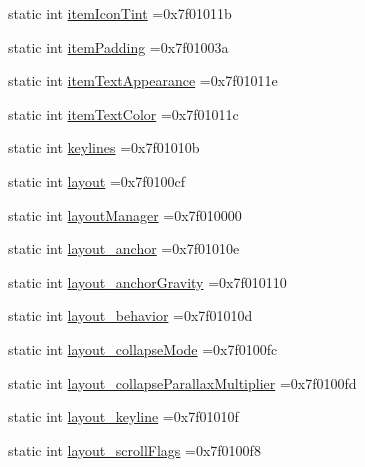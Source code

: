 \begin{DoxyCompactItemize}
static int \hyperlink{classandroid_1_1support_1_1graphics_1_1drawable_1_1R_1_1attr_a09810cf691cdb1d0ea29a12e2f0de04a}{item\+Icon\+Tint} =0x7f01011b
\item 
static int \hyperlink{classandroid_1_1support_1_1graphics_1_1drawable_1_1R_1_1attr_ac1e93d0be06d113523f87e0b3b6d7810}{item\+Padding} =0x7f01003a
\item 
static int \hyperlink{classandroid_1_1support_1_1graphics_1_1drawable_1_1R_1_1attr_ac97720f26eccd2c5a5b72930a9297912}{item\+Text\+Appearance} =0x7f01011e
\item 
static int \hyperlink{classandroid_1_1support_1_1graphics_1_1drawable_1_1R_1_1attr_aa9c6b70d39d287b5016e76134718fca8}{item\+Text\+Color} =0x7f01011c
\item 
static int \hyperlink{classandroid_1_1support_1_1graphics_1_1drawable_1_1R_1_1attr_ad3dde851a1427fea57cfeff89813c49c}{keylines} =0x7f01010b
\item 
static int \hyperlink{classandroid_1_1support_1_1graphics_1_1drawable_1_1R_1_1attr_aa4259dc1ddae8e91fd28209cd7a35c8e}{layout} =0x7f0100cf
\item 
static int \hyperlink{classandroid_1_1support_1_1graphics_1_1drawable_1_1R_1_1attr_a4224aee7193f65c83cab1f5837843f57}{layout\+Manager} =0x7f010000
\item 
static int \hyperlink{classandroid_1_1support_1_1graphics_1_1drawable_1_1R_1_1attr_a8edbd974e6fb3f6c893b59fe321abe31}{layout\+\_\+anchor} =0x7f01010e
\item 
static int \hyperlink{classandroid_1_1support_1_1graphics_1_1drawable_1_1R_1_1attr_a23e32a21b7efe7ecb69a6f00f418925d}{layout\+\_\+anchor\+Gravity} =0x7f010110
\item 
static int \hyperlink{classandroid_1_1support_1_1graphics_1_1drawable_1_1R_1_1attr_ad3c99fb2699ed3a535c2de1a01776207}{layout\+\_\+behavior} =0x7f01010d
\item 
static int \hyperlink{classandroid_1_1support_1_1graphics_1_1drawable_1_1R_1_1attr_a0c369a00bda6f9c5b48a641eee7195fe}{layout\+\_\+collapse\+Mode} =0x7f0100fc
\item 
static int \hyperlink{classandroid_1_1support_1_1graphics_1_1drawable_1_1R_1_1attr_a596115382c5316fa019df21524b620d2}{layout\+\_\+collapse\+Parallax\+Multiplier} =0x7f0100fd
\item 
static int \hyperlink{classandroid_1_1support_1_1graphics_1_1drawable_1_1R_1_1attr_a048d44a3f0aba3bf77f3bcf86348f3d0}{layout\+\_\+keyline} =0x7f01010f
\item 
static int \hyperlink{classandroid_1_1support_1_1graphics_1_1drawable_1_1R_1_1attr_a0e75b0c670e2be71119d8a695bdae52c}{layout\+\_\+scroll\+Flags} =0x7f0100f8

\end{DoxyCompactItemize}
